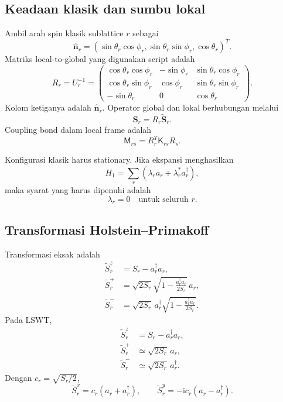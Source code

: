 \documentclass[11pt,a4paper]{article}
\newcommand{\ii}{\mathrm{i}}
\newcommand{\vS}{\bm S}
\newcommand{\vn}{\widehat{\bm n}}
\begin{document}
\subsection{Keadaan klasik dan sumbu lokal}

Ambil arah spin klasik sublattice $r$ sebagai
\begin{equation}
\vn_r=(\sin\theta_r\cos\phi_r,
\sin\theta_r\sin\phi_r,
\cos\theta_r)^T.
\end{equation}
Matriks local-to-global yang digunakan script adalah
\begin{equation}
R_r=U_r^{-1}=
\begin{pmatrix}
\cos\theta_r\cos\phi_r&-\sin\phi_r&\sin\theta_r\cos\phi_r\\
\cos\theta_r\sin\phi_r& \cos\phi_r&\sin\theta_r\sin\phi_r\\
-\sin\theta_r&0&\cos\theta_r
\end{pmatrix}.
\label{eq:rotation}
\end{equation}
Kolom ketiganya adalah $\vn_r$. Operator global dan lokal berhubungan melalui
\begin{equation}
\vS_r=R_r\widetilde{\vS}_r.
\end{equation}
Coupling bond dalam local frame adalah
\begin{equation}
\boxed{\mathsf M_{rs}=R_r^T\mathsf K_{rs}R_s}.
\label{eq:localbond}
\end{equation}

Konfigurasi klasik harus stationary. Jika ekspansi menghasilkan
\begin{equation}
H_1=\sum_r(\lambda_ra_r+\lambda_r^*a_r^\dagger),
\end{equation}
maka syarat yang harus dipenuhi adalah
\begin{equation}
\lambda_r=0\quad\text{untuk seluruh }r.
\end{equation}

\subsection{Transformasi Holstein--Primakoff}

Transformasi eksak adalah
\begin{align}
\widetilde S_r^z&=S_r-a_r^\dagger a_r,\\
\widetilde S_r^+&=\sqrt{2S_r}
\sqrt{1-\frac{a_r^\dagger a_r}{2S_r}}\,a_r,\\
\widetilde S_r^-&=\sqrt{2S_r}\,a_r^\dagger
\sqrt{1-\frac{a_r^\dagger a_r}{2S_r}}.
\end{align}
Pada LSWT,
\begin{align}
\widetilde S_r^z&=S_r-a_r^\dagger a_r,\\
\widetilde S_r^+&\simeq\sqrt{2S_r}\,a_r,\\
\widetilde S_r^-&\simeq\sqrt{2S_r}\,a_r^\dagger.
\end{align}
Dengan $c_r=\sqrt{S_r/2}$,
\begin{equation}
\widetilde S_r^x=c_r(a_r+a_r^\dagger),
\qquad
\widetilde S_r^y=-\ii c_r(a_r-a_r^\dagger).
\end{equation}
\end{document}
